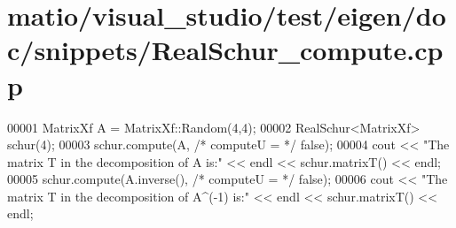 \hypertarget{matio_2visual__studio_2test_2eigen_2doc_2snippets_2_real_schur__compute_8cpp_source}{}\section{matio/visual\+\_\+studio/test/eigen/doc/snippets/\+Real\+Schur\+\_\+compute.cpp}
\label{matio_2visual__studio_2test_2eigen_2doc_2snippets_2_real_schur__compute_8cpp_source}

\begin{DoxyCode}
00001 MatrixXf A = MatrixXf::Random(4,4);
00002 RealSchur<MatrixXf> schur(4);
00003 schur.compute(A, \textcolor{comment}{/* computeU = */} \textcolor{keyword}{false});
00004 cout << \textcolor{stringliteral}{"The matrix T in the decomposition of A is:"} << endl << schur.matrixT() << endl;
00005 schur.compute(A.inverse(), \textcolor{comment}{/* computeU = */} \textcolor{keyword}{false});
00006 cout << \textcolor{stringliteral}{"The matrix T in the decomposition of A^(-1) is:"} << endl << schur.matrixT() << endl;
\end{DoxyCode}
